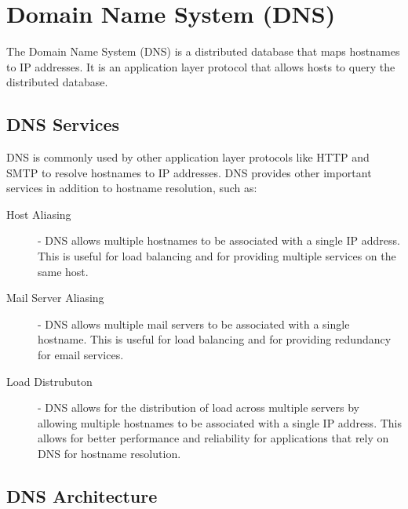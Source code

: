 \documentclass[12pt letter]{report}
\begin{document}
\chapter{Domain Name System (DNS)}


The Domain Name System (DNS) is a distributed database that maps
hostnames to IP addresses. It is an application layer protocol that
allows hosts to query the distributed database.

\section{DNS Services}

DNS is commonly used by other application layer protocols like HTTP
and SMTP to resolve hostnames to IP addresses. DNS provides other
important services in addition to hostname resolution, such as:


\begin{description}
  \item[Host Aliasing]  - DNS allows multiple hostnames to be associated with a
    single IP address. This is useful for load balancing and for
    providing multiple services on the same host.
  \item[Mail Server Aliasing] - DNS allows multiple mail servers to be
    associated with a single hostname. This is useful for load balancing
    and for providing redundancy for email services.
  \item[Load Distrubuton] - DNS allows for the distribution of load
    across multiple servers by allowing multiple hostnames to be
    associated with a single IP address. This allows for better
    performance and reliability for applications that rely on DNS for
    hostname resolution.
\end{description}

\section{DNS Architecture}
\end{document}
